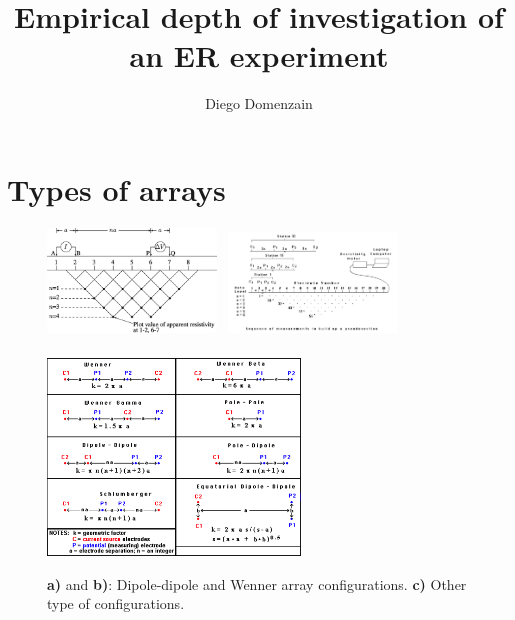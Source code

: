 \documentclass[a4paper,12pt]{article}
\title{Empirical depth of investigation of an ER experiment}
\author{Diego Domenzain}
\date{}
\begin{document}
\maketitle

%
\section{Types of arrays}
%
%
\begin{figure}[!h]
\centering
\includegraphics[width=0.4\textwidth]{../pics/dc-array-dipole-dipole-pseudosection.png}~
\includegraphics[width=0.4\textwidth]{../pics/wenner-pseudosection.png}\\~\\
\includegraphics[width=0.6\textwidth]{../pics/dc-arrays.png}
\caption{{\bf a)} and {\bf b)}: Dipole-dipole and Wenner array configurations. {\bf c)} Other type of configurations.}
\label{fig:depth-length}
\end{figure}
%
\newpage
\end{document}

